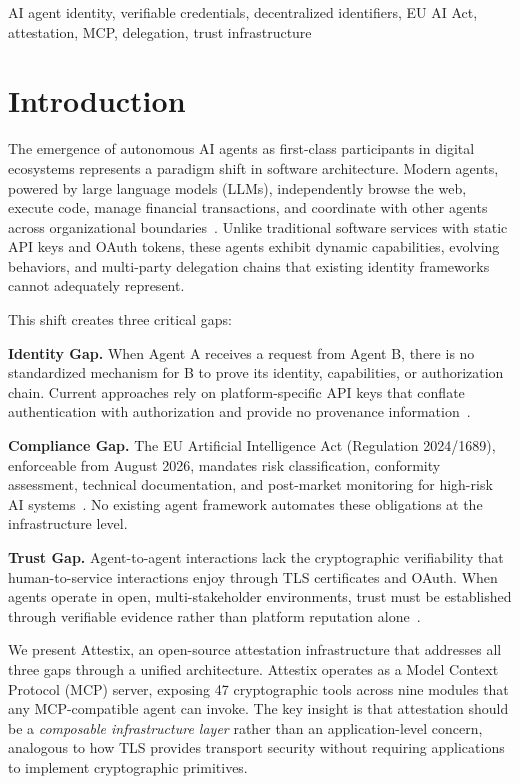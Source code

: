 \documentclass[conference]{IEEEtran}
\begin{document}
\begin{IEEEkeywords}
AI agent identity, verifiable credentials, decentralized identifiers, EU AI Act, attestation, MCP, delegation, trust infrastructure
\end{IEEEkeywords}

\section{Introduction}
\label{sec:introduction}

The emergence of autonomous AI agents as first-class participants in digital ecosystems represents a paradigm shift in software architecture. Modern agents, powered by large language models (LLMs), independently browse the web, execute code, manage financial transactions, and coordinate with other agents across organizational boundaries~\cite{chan2025infrastructure}. Unlike traditional software services with static API keys and OAuth tokens, these agents exhibit dynamic capabilities, evolving behaviors, and multi-party delegation chains that existing identity frameworks cannot adequately represent.

This shift creates three critical gaps:

\textbf{Identity Gap.} When Agent A receives a request from Agent B, there is no standardized mechanism for B to prove its identity, capabilities, or authorization chain. Current approaches rely on platform-specific API keys that conflate authentication with authorization and provide no provenance information~\cite{huang2025zerotrust}.

\textbf{Compliance Gap.} The EU Artificial Intelligence Act (Regulation 2024/1689), enforceable from August 2026, mandates risk classification, conformity assessment, technical documentation, and post-market monitoring for high-risk AI systems~\cite{euaiact2024}. No existing agent framework automates these obligations at the infrastructure level.

\textbf{Trust Gap.} Agent-to-agent interactions lack the cryptographic verifiability that human-to-service interactions enjoy through TLS certificates and OAuth. When agents operate in open, multi-stakeholder environments, trust must be established through verifiable evidence rather than platform reputation alone~\cite{garzon2025agents}.

We present Attestix, an open-source attestation infrastructure that addresses all three gaps through a unified architecture. Attestix operates as a Model Context Protocol (MCP) server, exposing 47 cryptographic tools across nine modules that any MCP-compatible agent can invoke. The key insight is that attestation should be a \emph{composable infrastructure layer} rather than an application-level concern, analogous to how TLS provides transport security without requiring applications to implement cryptographic primitives.
\end{document}
